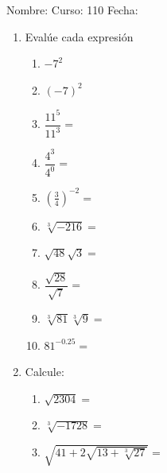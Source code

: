 \documentclass[fleqn]{article}
\newcommand{\LineaNombre}{%
\par
\vspace{\baselineskip}
Nombre:\hrulefill \; Curso: 110\underline{\hspace*{12pt}} \; Fecha: \underline{\hspace*{2.5cm}} \relax
\par}
\begin{document}
\LineaNombre
\begin{enumerate}
   \item Evalúe cada expresión
   \begin{enumerate}
   \item $-7^{2}$\noanswer
   \item $(-7)^{2}$\noanswer
   \item $\dfrac{11^{5}}{11^{3}}=$ \noanswer
   \item $\dfrac{4^{3}}{4^{0}}=$ \noanswer
   \item $(\frac{3}{4})^{-2}=$ \noanswer
   \item $\sqrt[3]{-216}=$\noanswer
   \item $\sqrt{48}\sqrt{3}=$\noanswer
   \item $\dfrac{\sqrt{28}}{\sqrt{7}}=$\noanswer
   \item $\sqrt[3]{81}\sqrt[3]{9}=$\noanswer
   \item $81^{-0.25}=$\noanswer
   \end{enumerate}
   \item Calcule:
   \begin{enumerate}
   \item $\sqrt{2304}=$
   \item $\sqrt[3]{-1728}=$
   \item $\sqrt{41+2\sqrt{13+\sqrt[3]{27}}}=$\noanswer
   \end{enumerate}
   \end{enumerate}
\end{document}

